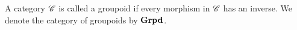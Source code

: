 \begin{defin}
    A category $\mathscr{C}$ is called a groupoid if every morphism in $\mathscr{C}$ has an
    inverse. We denote the category of groupoids by $\operatorname{\textbf{Grpd}}$.
\end{defin}



